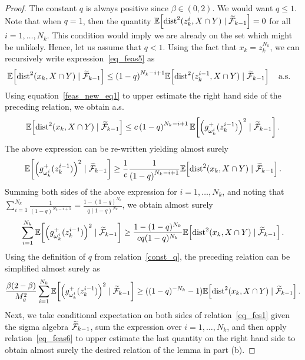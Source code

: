 \documentclass{article}
\def\cF{{\cal F}}
\def\dist{{\rm dist}}
\newcommand{\EXP}[1]
{\mathbb{E}\!\left[#1\right] }
\theoremstyle{plain}
\theoremstyle{definition}
\theoremstyle{remark}
\begin{document}
\begin{proof}
The constant $q$ is always positive since $\beta \in (0,2)$. We would want $q \leq 1$. Note that when $q = 1$, then the quantity $\EXP{\dist^2(z_k^i, X \cap Y) \mid \widetilde \cF_{k-1}} = 0$ for all $i = 1, \ldots, N_k$. This condition would imply we are already on the set which might be unlikely. Hence, let us assume that $q < 1$. Using the fact that $x_k = z_k^{N_k}$, we can recursively write expression~\eqref{eq_feas5} as
\begin{align}
    \EXP{\dist^2(x_k, X \cap Y) \mid \widetilde \cF_{k-1}} \leq \left( 1 - q \right)^{N_k - i + 1} &\EXP{\dist^2(z_{k}^{i-1}, X \cap Y) \mid \widetilde \cF_{k-1}} \quad \text{a.s.} \nonumber
\end{align}
Using equation~\eqref{feas_new_eq1} to upper estimate the right hand side of the preceding relation, we obtain a.s.
\begin{align}
    \EXP{\dist^2(x_k, X \cap Y) \mid \widetilde \cF_{k-1}} \leq c \left( 1 - q \right)^{N_k - i + 1} \EXP{\left(g^+_{\omega_{k}^{i}}(z_{k}^{i-1})\right)^2 \mid \widetilde \cF_{k-1}} . \nonumber
\end{align}
The above expression can be re-written yielding almost surely
\begin{align}
    \EXP{\left(g^+_{\omega_{k}^{i}}(z_{k}^{i-1})\right)^2 \mid \widetilde \cF_{k-1}} \geq \frac{1}{c} \frac{1}{\left( 1 - q \right)^{N_k - i + 1}} \EXP{\dist^2(x_k, X \cap Y) \mid \widetilde \cF_{k-1}} . \nonumber
\end{align}
Summing both sides of the above expression for $i = 1, \ldots, N_k$, and noting that $\sum_{i=1}^{N_k} \frac{1}{\left( 1 - q \right)^{N_k - i + 1}} = \frac{1 - (1-q)^{N_k}}{q(1-q)^{N_k}}$, we obtain almost surely
\begin{align}
    \sum_{i=1}^{N_k} \EXP{\left(g^+_{\omega_{k}^{i}}(z_{k}^{i-1})\right)^2 \mid \widetilde \cF_{k-1}} \geq \frac{1 - (1-q)^{N_k}}{c q(1-q)^{N_k}} \EXP{\dist^2(x_k, X \cap Y) \mid \widetilde \cF_{k-1}} . \nonumber
\end{align}
Using the definition of $q$ from relation~\eqref{const_q}, the preceding relation can be simplified almost surely as
\begin{align}
    \frac{\beta(2-\beta)}{M_g^2} \sum_{i=1}^{N_k} \EXP{\left(g^+_{\omega_{k}^{i}}(z_{k}^{i-1})\right)^2 \mid \widetilde \cF_{k-1}} \geq ((1-q)^{-N_k} - 1) \EXP{\dist^2(x_k, X \cap Y) \mid \widetilde \cF_{k-1}} . \label{eq_feas6}
\end{align}
Next, we take conditional expectation on both sides of relation~\eqref{eq_fes1} given the sigma algebra $\widetilde \cF_{k-1}$, sum the expression over $i=1, \ldots, N_k$, and then apply relation~\eqref{eq_feas6} to upper estimate the last quantity on the right hand side to obtain almost surely the desired relation of the lemma in part (b).
\end{proof}
\end{document}
